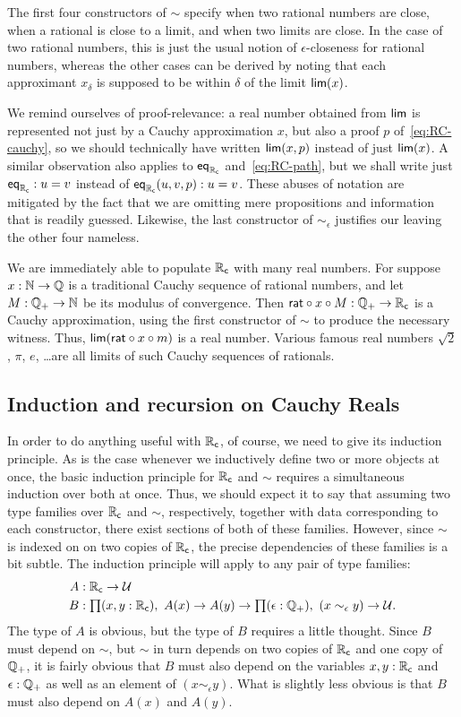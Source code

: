 The first four constructors of $\sim$ specify when two rational numbers are close, when a rational is close to a limit, and when two limits are close.
In the case of two rational numbers, this is just the usual notion of $\epsilon$-closeness for rational numbers, whereas the other cases can be derived by noting that each approximant $x_\delta$ is supposed to be within $\delta$ of the limit $\mathsf{lim}(x)$.

We remind ourselves of proof-relevance: a real number obtained from $\mathsf{lim}$ is represented not
just by a Cauchy approximation $x$, but also a proof $p$ of~\eqref{eq:RC-cauchy}, so we
should technically have written $\mathsf{lim}(x,p)$ instead of just $\mathsf{lim}(x)$.
A similar observation also applies to $\mathsf{eq}_{\mathbb{R}_\mathsf{c}}$ and~\eqref{eq:RC-path}, but we shall write just
$\mathsf{eq}_{\mathbb{R}_\mathsf{c}} : u = v$ instead of $\mathsf{eq}_{\mathbb{R}_\mathsf{c}}(u, v, p) : u = v$. These abuses of notation are
mitigated by the fact that we are omitting mere propositions and information that is
readily guessed.
Likewise, the last constructor of $\mathord{\sim_\epsilon}$ justifies our leaving the other four nameless.

We are immediately able to populate $\mathbb{R}_\mathsf{c}$ with many real numbers. For suppose $x : \mathbb{N} \to
\mathbb{Q}$ is a traditional Cauchy sequence of rational numbers, and let $M : \mathbb{Q}_{+} \to \mathbb{N}$ be its
modulus of convergence. Then $\mathsf{rat} \circ x \circ M : \mathbb{Q}_{+} \to \mathbb{R}_\mathsf{c}$ is a Cauchy
approximation, using the first constructor of $\sim$ to produce the necessary witness.
Thus, $\mathsf{lim}(\mathsf{rat} \circ x \circ m)$ is a real number. Various famous
real numbers $\sqrt{2}$, $\pi$, $e$, \dots are all limits of such Cauchy sequences of
rationals.

\subsection{Induction and recursion on Cauchy Reals}
\label{sec:induct-recurs-cauchy}

In order to do anything useful with $\mathbb{R}_\mathsf{c}$, of course, we need to give its induction principle.
As is the case whenever we inductively define two or more objects at once, the basic induction principle for $\mathbb{R}_\mathsf{c}$ and $\mathord\sim$ requires a simultaneous induction over both at once.
Thus, we should expect it to say that assuming two type families over $\mathbb{R}_\mathsf{c}$ and $\sim$, respectively, together with data corresponding to each constructor, there exist sections of both of these families.
However, since $\sim$ is indexed on on two copies of $\mathbb{R}_\mathsf{c}$, the precise dependencies of these families is a bit subtle.
The induction principle will apply to any pair of type families:
\begin{align*}
A&:\RC\to\type\\
B&:\prd{x,y:\RC} A(x) \to A(y) \to \prd{\epsilon:\Qp} (x\sim_\epsilon y) \to \type.
\end{align*}
The type of $A$ is obvious, but the type of $B$ requires a little thought.
Since $B$ must depend on $\sim$, but $\sim$ in turn depends on two copies of $\mathbb{R}_\mathsf{c}$ and one copy of $\mathbb{Q}_{+}$, it is fairly obvious that $B$ must also depend on the variables $x,y:\mathbb{R}_\mathsf{c}$ and $\epsilon:\mathbb{Q}_{+}$ as well as an element of $(x\sim_\epsilon y)$.
What is slightly less obvious is that $B$ must also depend on $A(x)$ and $A(y)$.

